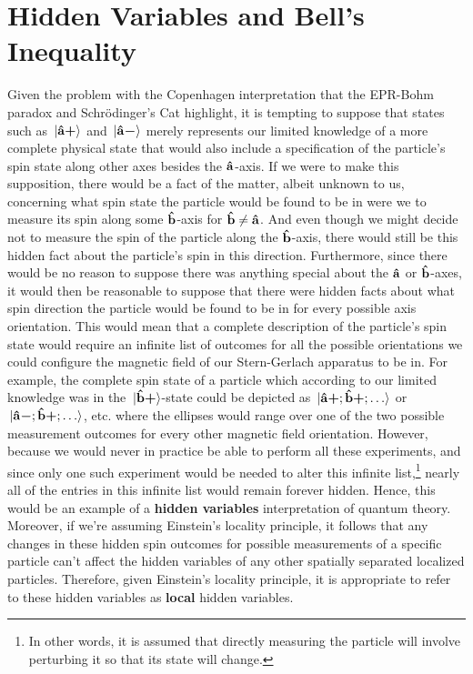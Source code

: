 \section{Hidden Variables and Bell's Inequality}\label{hiddenbellsection}
Given the problem with the Copenhagen interpretation that the EPR-Bohm paradox and Schr\"{o}dinger's Cat highlight, it is tempting to suppose that states such as $\ket*{{\vb{\hat{{a}}}\bm{+}}}$ and $\ket*{{\vb{\hat{{a}}}\bm{-}}}$ merely represents our limited knowledge of a more complete physical state that would also include a specification of the particle's spin state along other axes besides the $\vb{\hat{{a}}}$-axis. If we were to make this supposition, there would be a fact of the matter, albeit unknown to us, concerning what spin state the particle would be found to be in  were we to measure its spin along some $\vb{\hat{{b}}}$-axis for $\vb{\hat{{b}}}\neq\vb{\hat{{a}}}$. And  even though we might decide not to measure the spin of the particle along the $\vb{\hat{{b}}}$-axis, there would still be this hidden fact about the particle's spin in this direction. Furthermore, since there would be no reason to suppose there was anything special about the $\vb{\hat{{a}}}$ or $\vb{\hat{{b}}}$-axes, it would then be reasonable to suppose that there were hidden facts about what spin direction the particle would be found to be in for every possible axis orientation. This would mean that a complete description of the particle's spin state would require an infinite list of outcomes for all the possible orientations we could configure the magnetic field of our Stern-Gerlach apparatus to be in. For example, the complete spin state of a particle which according to our limited knowledge was in the $\ket*{{\vb{\hat{{b}}}\bm{+}}}$-state could be depicted as $\ket*{{\vb{\hat{{a}}}\bm{+}};{\vb{\hat{{b}}}\bm{+}};\ldots}$ or  $\ket*{{\vb{\hat{{a}}}\bm{-}};{\vb{\hat{{b}}}\bm{+}};\ldots}$,  %
%
etc. where the ellipses would range over one of the two possible measurement outcomes for every other magnetic field orientation. However, because we would never in practice be able to perform all these experiments, and since only one such experiment would be needed to alter { this infinite list,\footnote{In other words, it is assumed that directly measuring the particle will involve perturbing it so that its state will change.} nearly} all of the entries in this infinite list would remain forever hidden. Hence, this would be an example of a \textbf{hidden variables} interpretation of quantum theory.  Moreover, if we're assuming Einstein's locality principle, it follows that any changes in these hidden spin outcomes for possible measurements of a specific particle can't affect the hidden variables of any other spatially separated localized particles. Therefore, given Einstein's locality principle, it is appropriate to refer to these hidden variables as \textbf{local} hidden variables.

